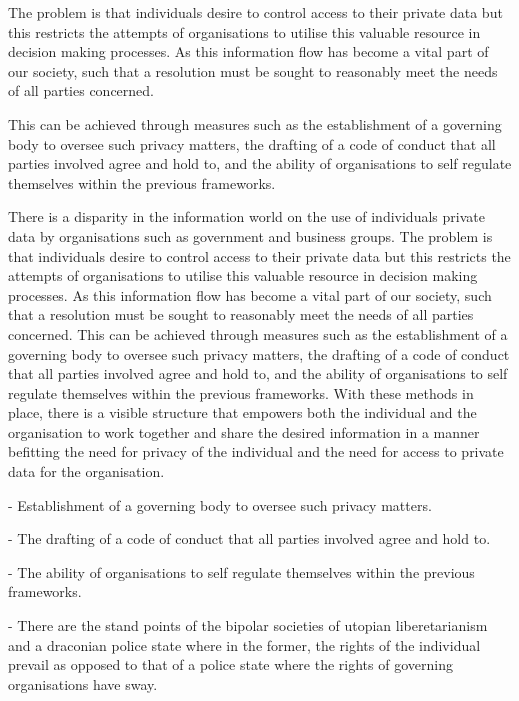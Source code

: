 



The problem is that individuals desire to control access to their private data but this restricts the attempts of organisations to utilise this valuable resource in decision making processes. As this information flow has become a vital part of our society, such that a resolution must be sought to reasonably meet the needs of all parties concerned.


This can be achieved through measures such as the establishment of a governing body to oversee such privacy matters, the drafting of a code of conduct that all parties involved agree and hold to, and the ability of organisations to self regulate themselves within the previous frameworks.


There is a disparity in the information world on the use of individuals private data by organisations such as government and business groups. The problem is that individuals desire to control access to their private data but this restricts the attempts of organisations to utilise this valuable resource in decision making processes. As this information flow has become a vital part of our society, such that a resolution must be sought to reasonably meet the needs of all parties concerned. This can be achieved through measures such as the establishment of a governing body to oversee such privacy matters, the drafting of a code of conduct that all parties involved agree and hold to, and the ability of organisations to self regulate themselves within the previous frameworks.  With these methods in place, there is a visible structure that empowers both the individual and the organisation to work together and share the desired information in a manner befitting the need for privacy of the individual and the need for access to private data for the organisation.


\item - Establishment of a governing body to oversee such privacy matters.
\item - The drafting of a code of conduct that all parties involved agree and hold to.
\item - The ability of organisations to self regulate themselves within the previous frameworks.
\item - There are the stand points of the bipolar societies of utopian liberetarianism and a draconian police state where in the former, the rights of the individual prevail as opposed to that of a police state where the rights of governing organisations have sway.

